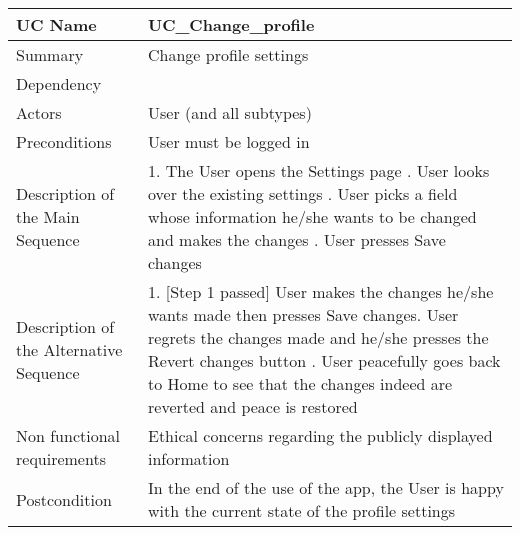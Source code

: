 \begin{table}[htbp]
\centering
\begin{tabularx}{\textwidth}{|l|X|}
\hline
UC Name & UC\_Change\_profile \\ \hline

Summary &  Change profile settings \\ \hline

Dependency & \- \\ \hline

Actors & User (and all subtypes) \\ \hline

Preconditions & User must be logged in \\ \hline

Description of the Main Sequence & 1.	The User opens the Settings page \newline  2.	User looks over the existing settings \newline 3.	User picks a field whose information he/she wants to be changed and makes the changes \newline 4. User presses Save changes \\ \hline

Description of the Alternative Sequence & 1.	[Step 1\-2 passed] User makes the changes he/she wants made then presses Save changes\newline 2. User regrets the changes made and he/she presses the Revert changes button \newline 3.	User peacefully goes back to Home to see that the changes indeed are reverted and peace is restored \\ \hline

Non functional requirements & Ethical concerns regarding the publicly displayed information \\ \hline

Postcondition & In the end of the use of the app, the User is happy with the current state of the profile settings \\ \hline

\end{tabularx}
\end{table}

